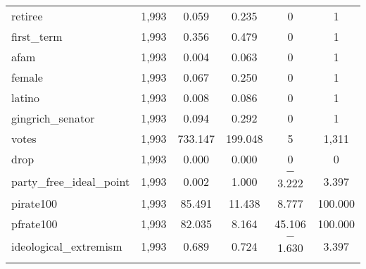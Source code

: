 \documentclass[12pt]{article}
\begin{document}
\begin{table}[H]
\begin{tabular}{@{\extracolsep{5pt}}lccccc}
		retiree & 1,993 & 0.059 & 0.235 & 0 & 1 \\ 
		first\_term & 1,993 & 0.356 & 0.479 & 0 & 1 \\ 
		afam & 1,993 & 0.004 & 0.063 & 0 & 1 \\ 
		female & 1,993 & 0.067 & 0.250 & 0 & 1 \\ 
		latino & 1,993 & 0.008 & 0.086 & 0 & 1 \\ 
		gingrich\_senator & 1,993 & 0.094 & 0.292 & 0 & 1 \\ 
		votes & 1,993 & 733.147 & 199.048 & 5 & 1,311 \\ 
		drop & 1,993 & 0.000 & 0.000 & 0 & 0 \\ 
		party\_free\_ideal\_point & 1,993 & 0.002 & 1.000 & $-$3.222 & 3.397 \\ 
		pirate100 & 1,993 & 85.491 & 11.438 & 8.777 & 100.000 \\ 
		pfrate100 & 1,993 & 82.035 & 8.164 & 45.106 & 100.000 \\ 
		ideological\_extremism & 1,993 & 0.689 & 0.724 & $-$1.630 & 3.397 \\
		\hline \\[-1.8ex] 
	\end{tabular} 
\end{table} 
\end{document}
